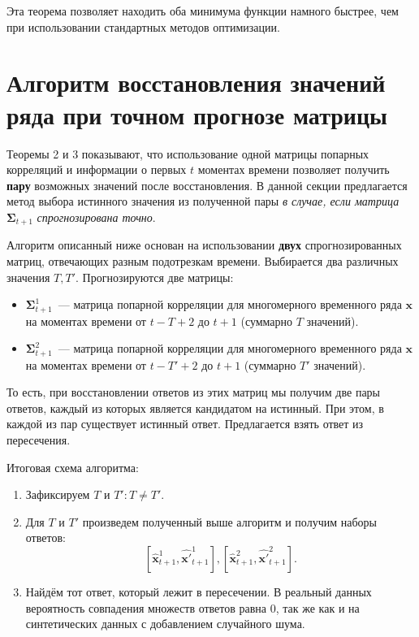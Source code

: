 \documentclass{article}
\begin{document}
Эта теорема позволяет находить оба минимума функции намного быстрее, чем при использовании стандартных методов оптимизации.

\section{Алгоритм восстановления значений ряда при точном прогнозе матрицы}

Теоремы 2 и 3 показывают, что использование одной матрицы попарных корреляций и информации о первых $t$ моментах времени позволяет получить \textbf{пару} возможных значений после восстановления. В данной секции предлагается метод выбора истинного значения из полученной пары \textit{в случае, если матрица}  $\mathbf{\Sigma}_{t+1}$  \textit{спрогнозирована точно}.

Алгоритм описанный ниже основан на использовании \textbf{двух} спрогнозированных матриц, отвечающих разным подотрезкам времени. Выбирается два различных значения $T, T'$. Прогнозируются две матрицы:
\begin{itemize}
	\item $\mathbf{\Sigma}_{t+1}^1$~--- матрица попарной корреляции для многомерного временного ряда $\mathbf{x}$ на моментах времени от $t-T+2$ до $t+1$ (суммарно $T$ значений).
	\item $\mathbf{\Sigma}_{t+1}^2$~--- матрица попарной корреляции для многомерного временного ряда $\mathbf{x}$ на моментах времени от $t-T'+2$ до $t+1$ (суммарно $T'$ значений).
\end{itemize}

То есть, при восстановлении ответов из этих матриц мы получим две пары ответов, каждый из которых является кандидатом на истинный. При этом, в каждой из пар существует истинный ответ. Предлагается взять ответ из пересечения.

Итоговая схема алгоритма:

\begin{enumerate}
	\item Зафиксируем $T$ и $T': T \neq T'$.
	\item Для $T$ и $T'$ произведем полученный выше алгоритм и получим наборы ответов: \[ [\hat{\mathbf{x}}_{t+1}^1, \hat{\mathbf{x}'}_{t+1}^1], [\hat{\mathbf{x}}_{t+1}^2, \hat{\mathbf{x}'}_{t+1}^2].\]
	\item Найдём тот ответ, который лежит в пересечении.
	В реальный данных вероятность совпадения множеств ответов равна 0, так же как и на синтетических данных с добавлением случайного шума.
\end{enumerate}
\end{document}

